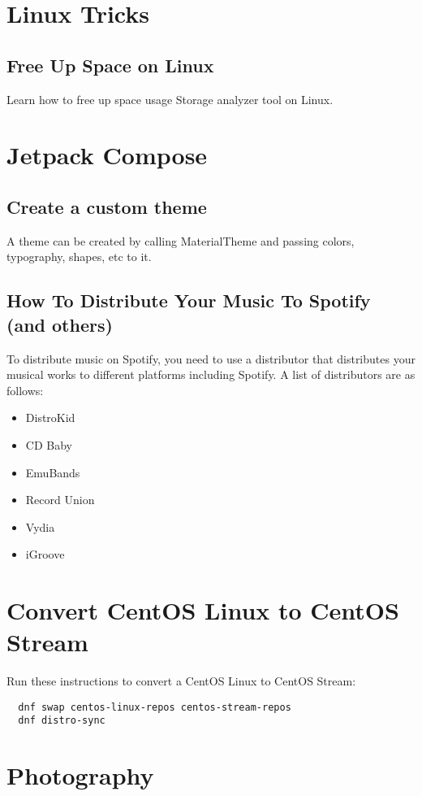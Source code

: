 \documentclass{article}
\begin{document}
\section{Linux Tricks}
\subsection{Free Up Space on Linux}
Learn how to free up space usage Storage analyzer tool on Linux.

\section{Jetpack Compose}
\subsection{Create a custom theme}
A theme can be created by calling MaterialTheme and passing colors, typography, shapes, etc to it. 

\subsection{How To Distribute Your Music To Spotify (and others)}
To distribute music on Spotify, you need to use a distributor that distributes your musical works to different platforms including Spotify. A list of distributors are as follows:  
\begin{itemize}
	\item DistroKid 
	\item CD Baby
	\item EmuBands
	\item Record Union
	\item Vydia
	\item iGroove
	
\end{itemize}


\section{Convert CentOS Linux to CentOS Stream}
Run these instructions to convert a CentOS Linux to CentOS Stream:
\begin{lstlisting}
  dnf swap centos-linux-repos centos-stream-repos
  dnf distro-sync
\end{lstlisting}

\section{Photography}
\end{document}
